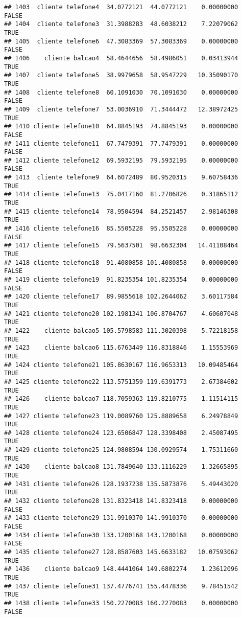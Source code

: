 \documentclass[
]{article}
\begin{document}
\begin{verbatim}
## 1403  cliente telefone4  34.0772121  44.0772121    0.00000000    FALSE
## 1404  cliente telefone3  31.3988283  48.6038212    7.22079062     TRUE
## 1405  cliente telefone6  47.3083369  57.3083369    0.00000000    FALSE
## 1406    cliente balcao4  58.4644656  58.4986051    0.03413944     TRUE
## 1407  cliente telefone5  38.9979658  58.9547229   10.35090170     TRUE
## 1408  cliente telefone8  60.1091030  70.1091030    0.00000000    FALSE
## 1409  cliente telefone7  53.0036910  71.3444472   12.38972425     TRUE
## 1410 cliente telefone10  64.8845193  74.8845193    0.00000000    FALSE
## 1411 cliente telefone11  67.7479391  77.7479391    0.00000000    FALSE
## 1412 cliente telefone12  69.5932195  79.5932195    0.00000000    FALSE
## 1413  cliente telefone9  64.6072489  80.9520315    9.60758436     TRUE
## 1414 cliente telefone13  75.0417160  81.2706826    0.31865112     TRUE
## 1415 cliente telefone14  78.9504594  84.2521457    2.98146308     TRUE
## 1416 cliente telefone16  85.5505228  95.5505228    0.00000000    FALSE
## 1417 cliente telefone15  79.5637501  98.6632304   14.41108464     TRUE
## 1418 cliente telefone18  91.4080858 101.4080858    0.00000000    FALSE
## 1419 cliente telefone19  91.8235354 101.8235354    0.00000000    FALSE
## 1420 cliente telefone17  89.9855618 102.2644062    3.60117584     TRUE
## 1421 cliente telefone20 102.1981341 106.8704767    4.60607048     TRUE
## 1422    cliente balcao5 105.5798583 111.3020398    5.72218158     TRUE
## 1423    cliente balcao6 115.6763449 116.8318846    1.15553969     TRUE
## 1424 cliente telefone21 105.8630167 116.9653313   10.09485464     TRUE
## 1425 cliente telefone22 113.5751359 119.6391773    2.67384602     TRUE
## 1426    cliente balcao7 118.7059363 119.8210775    1.11514115     TRUE
## 1427 cliente telefone23 119.0089760 125.8889658    6.24978849     TRUE
## 1428 cliente telefone24 123.6506847 128.3398408    2.45087495     TRUE
## 1429 cliente telefone25 124.9808594 130.0929574    1.75311660     TRUE
## 1430    cliente balcao8 131.7849640 133.1116229    1.32665895     TRUE
## 1431 cliente telefone26 128.1937238 135.5873876    5.49443020     TRUE
## 1432 cliente telefone28 131.8323418 141.8323418    0.00000000    FALSE
## 1433 cliente telefone29 131.9910370 141.9910370    0.00000000    FALSE
## 1434 cliente telefone30 133.1200168 143.1200168    0.00000000    FALSE
## 1435 cliente telefone27 128.8587603 145.6633182   10.07593062     TRUE
## 1436    cliente balcao9 148.4441064 149.6802274    1.23612096     TRUE
## 1437 cliente telefone31 137.4776741 155.4478336    9.78451542     TRUE
## 1438 cliente telefone33 150.2270083 160.2270083    0.00000000    FALSE

\end{verbatim}
\end{document}
